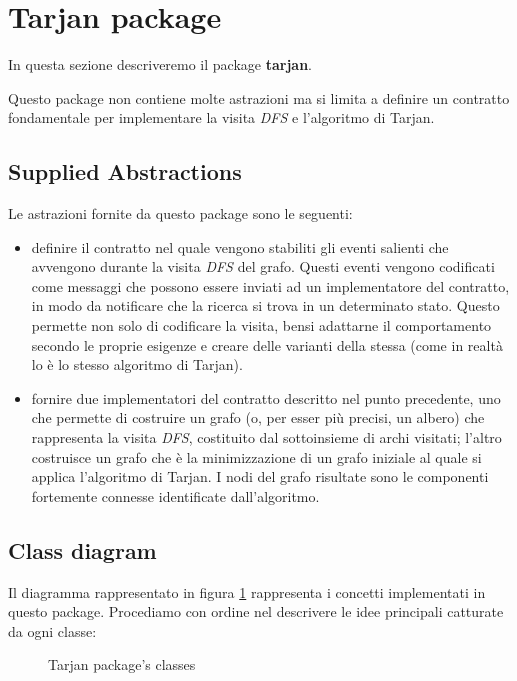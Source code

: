 \section{Tarjan package}

In questa sezione descriveremo il package \textbf{tarjan}.

Questo package non contiene molte astrazioni ma si limita a definire
un contratto fondamentale per implementare la visita \emph{DFS} e
l'algoritmo di Tarjan.

\subsection{Supplied Abstractions}

Le astrazioni fornite da questo package sono le seguenti:
\begin{itemize}
\item definire il contratto nel quale vengono stabiliti gli eventi
  salienti che avvengono durante la visita \emph{DFS} del
  grafo. Questi eventi vengono codificati come messaggi che possono
  essere inviati ad un implementatore del contratto, in modo da
  notificare che la ricerca si trova in un determinato stato. Questo
  permette non solo di codificare la visita, bensi adattarne il
  comportamento secondo le proprie esigenze e creare delle varianti
  della stessa (come in realt\`a lo \`e lo stesso algoritmo di
  Tarjan).
\item fornire due implementatori del contratto descritto nel punto
  precedente, uno che permette di costruire un grafo (o, per esser
  pi\`u precisi, un albero) che rappresenta la visita \emph{DFS},
  costituito dal sottoinsieme di archi visitati; l'altro costruisce un
  grafo che \`e la minimizzazione di un grafo iniziale al quale si
  applica l'algoritmo di Tarjan. I nodi del grafo risultate sono le
  componenti fortemente connesse identificate dall'algoritmo.
\end{itemize}

\subsection{Class diagram}
Il diagramma rappresentato in figura \ref{fig:tarjan-package-classes}
rappresenta i concetti implementati in questo package. Procediamo con
ordine nel descrivere le idee principali catturate da ogni classe:

\begin{figure}
  \centering
  \caption{Tarjan package's classes}
  \label{fig:tarjan-package-classes}
\end{figure}

